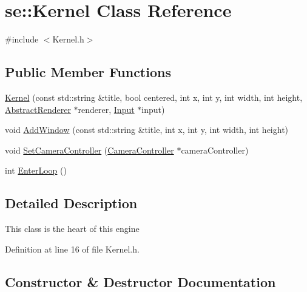 \hypertarget{classse_1_1_kernel}{}\section{se\+:\+:Kernel Class Reference}
\label{classse_1_1_kernel}


{\ttfamily \#include $<$Kernel.\+h$>$}

\subsection*{Public Member Functions}
\begin{DoxyCompactItemize}
\item 
\mbox{\hyperlink{classse_1_1_kernel_a3b5a0ed3fc4ba8a4be28adc77f803bd5}{Kernel}} (const std\+::string \&title, bool centered, int x, int y, int width, int height, \mbox{\hyperlink{classse_1_1_abstract_renderer}{Abstract\+Renderer}} $\ast$renderer, \mbox{\hyperlink{classse_1_1_input}{Input}} $\ast$input)
\item 
void \mbox{\hyperlink{classse_1_1_kernel_aa65f624076feaa97a95901077df35357}{Add\+Window}} (const std\+::string \&title, int x, int y, int width, int height)
\item 
void \mbox{\hyperlink{classse_1_1_kernel_a60a807b4f4e928752e7512f5b7b4a17c}{Set\+Camera\+Controller}} (\mbox{\hyperlink{classse_1_1_camera_controller}{Camera\+Controller}} $\ast$camera\+Controller)
\item 
int \mbox{\hyperlink{classse_1_1_kernel_a1faeac6fce02ccd7ff76d94ad78e0754}{Enter\+Loop}} ()
\end{DoxyCompactItemize}


\subsection{Detailed Description}
This class is the heart of this engine 

Definition at line 16 of file Kernel.\+h.



\subsection{Constructor \& Destructor Documentation}
\mbox{\label{classse_1_1_kernel_a3b5a0ed3fc4ba8a4be28adc77f803bd5}} 

